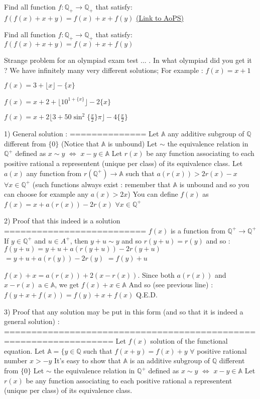 \begin{problem}
	Find all function $ f:\mathbb{Q}_{+}\rightarrow\mathbb{Q}_{+} $ that satisfy:
$ f(f(x)+x+y) = f(x)+x+f(y)$
	\flushright \href{https://artofproblemsolving.com/community/c6h529498}{(Link to AoPS)}
\end{problem}



\begin{solution}
	\begin{tcolorbox}Find all function $ f:\mathbb{Q}_{+}\rightarrow\mathbb{Q}_{+} $ that satisfy:
$ f(f(x)+x+y) = f(x)+x+f(y)$\end{tcolorbox}
Strange problem for an olympiad exam \/ test \/ ... . In what olympiad  did you get it ?
We have infinitely many very different solutions; For example :
$f(x)=x+1$ 

$f(x)=3+\lfloor x\rfloor-\{x\}$

$f(x)=x+2+\lfloor 10^{1+\{x\}}\rfloor-2\{x\}$

$f(x)=x+2\lfloor3+50\sin^2 \{\frac x2\}\pi \rfloor-4\{\frac x2\}$

1) General solution :
==============
Let $\mathbb A$ any additive subgroup of $\mathbb Q$ different from $\{0\}$ (Notice that $\mathbb A$ is unbound)
Let $\sim$ the equivalence relation in $\mathbb Q^+$ defined as $x\sim y$ $\iff$ $x-y\in\mathbb A$
Let $r(x)$ be any function associating to each positive rational a representent (unique per class) of its equivalence class.
Let $a(x)$ any function from $r(\mathbb Q^+)\to \mathbb A$ such that $a(r(x))>2r(x)-x$ $\forall x\in\mathbb Q^+$ (such functions always exist : remember that $\mathbb A$ is unbound and so you can choose for example any $a(x)>2x$)
You can define $f(x)$ as $\boxed{f(x)=x+a(r(x))-2r(x)}$ $\forall x\in\mathbb Q^+$

2) Proof that this indeed is a solution
==========================
$f(x)$ is a function from $\mathbb Q^+\to\mathbb Q^+$ 
If $y\in\mathbb Q^+$ and $u\in A^+$, then $y+u\sim y$ and so $r(y+u)=r(y)$ and so :
$f(y+u)=y+u+a(r(y+u))-2r(y+u)$ $=y+u+a(r(y))-2r(y)$ $=f(y)+u$

$f(x)+x=a(r(x))+2(x-r(x))$. Since both $a(r(x))$ and $x-r(x)$ a$\in\mathbb A$, we get $f(x)+x\in\mathbb A$
And so (see previous line) : $f(y+x+f(x))=f(y)+x+f(x)$
Q.E.D.

3) Proof that any solution may be put in this form (and so that it is indeed a general solution) :
==================================================================
Let $f(x)$ solution of the functional equation.
Let $\mathbb A=\{y\in\mathbb Q$ such that $f(x+y)=f(x)+y$ $\forall$ positive rational number ${x>-y}$
It's easy to show that $\mathbb A$ is an additive subgroup of $\mathbb Q$ different from $\{0\}$
Let $\sim$ the equivalence relation in $\mathbb Q^+$ defined as $x\sim y$ $\iff$ $x-y\in\mathbb A$
Let $r(x)$ be any function associating to each positive rational a representent (unique per class) of its equivalence class.


\end{solution}
